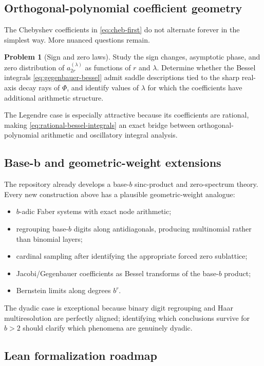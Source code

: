 \documentclass[11pt,oneside]{article}
\theoremstyle{definition}
\newtheorem{problem}[theorem]{Problem}
\theoremstyle{remark}
\newcommand{\1}{\mathbf 1}
\begin{document}
\subsection{Orthogonal-polynomial coefficient geometry}

The Chebyshev coefficients in \eqref{eq:cheb-first} do not alternate forever
in the simplest way.  More nuanced questions remain.

\begin{problem}[Sign and zero laws]
Study the sign changes, asymptotic phase, and zero distribution of
$a_{2r}^{(\lambda)}$ as functions of $r$ and $\lambda$.  Determine whether the
Bessel integrals \eqref{eq:gegenbauer-bessel} admit saddle descriptions tied
to the sharp real-axis decay rays of $\Phi$, and identify values of
$\lambda$ for which the coefficients have additional arithmetic structure.
\end{problem}

The Legendre case is especially attractive because its coefficients are
rational, making \eqref{eq:rational-bessel-integrals} an exact bridge between
orthogonal-polynomial arithmetic and oscillatory integral analysis.

\subsection{Base-b and geometric-weight extensions}

The repository already develops a base-$b$ sinc-product and zero-spectrum
theory.  Every new construction above has a plausible geometric-weight
analogue:
\begin{itemize}
\item $b$-adic Faber systems with exact node arithmetic;
\item regrouping base-$b$ digits along antidiagonals, producing multinomial
      rather than binomial layers;
\item cardinal sampling after identifying the appropriate forced zero
      sublattice;
\item Jacobi/Gegenbauer coefficients as Bessel transforms of the base-$b$
      product;
\item Bernstein limits along degrees $b^r$.
\end{itemize}
The dyadic case is exceptional because binary digit regrouping and Haar
multiresolution are perfectly aligned; identifying which conclusions survive
for $b>2$ should clarify which phenomena are genuinely dyadic.

\subsection{Lean formalization roadmap}
\end{document}
